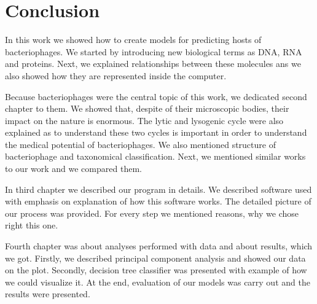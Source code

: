\chapter*{Conclusion} %

In this work we showed how to create models for predicting hosts of bacteriophages.
We started by introducing new biological terms as DNA, RNA and proteins.
Next, we explained relationships between these molecules ans we also showed how they are represented inside the computer.

Because bacteriophages were the central topic of this work, we dedicated second chapter to them.
We showed that, despite of their microscopic bodies, their impact on the nature is enormous.
The lytic and lysogenic cycle were also explained as to understand these two cycles is important in order to understand the medical potential of bacteriophages.
We also mentioned structure of bacteriophage and taxonomical classification.
Next, we mentioned similar works to our work and we compared them.

In third chapter we described our program in details.
We described software used with emphasis on explanation of how this software works.
The detailed picture of our process was provided.
For every step we mentioned reasons, why we chose right this one.

Fourth chapter was about analyses performed with data and about results, which we got.
Firstly, we described principal component analysis and showed our data on the plot.
Secondly, decision tree classifier was presented with example of how we could visualize it.
At the end, evaluation of our models was carry out and the results were presented.